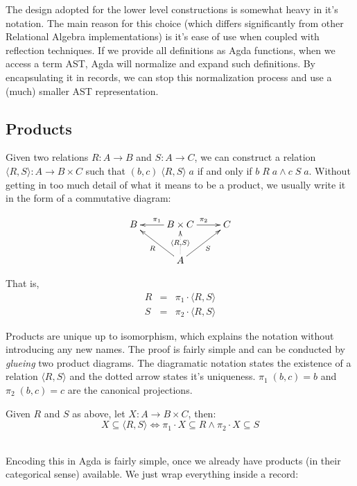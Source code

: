 The design adopted for the lower level constructions is somewhat heavy in it's notation. The
main reason for this choice (which differs significantly from other Relational Algebra implementations)
is it's ease of use when coupled with reflection techniques. If we provide all definitions
as Agda functions, when we access a term AST, Agda will normalize and expand such definitions.
By encapsulating it in records, we can stop this normalization process and use a (much) smaller
AST representation.

\subsection{Products}

Given two relations $R : A \rightarrow B$ and $S : A \rightarrow C$, we can construct a relation
$\langle R , S \rangle : A \rightarrow B \times C$ such that $(b,c)\;\langle R , S \rangle\;a$ if and only if $b\;R\;a \wedge c\;S\;a$.
Without getting in too much detail of what it means to be a product, we usually write
it in the form of a commutative diagram:

\begin{displaymath}
\xymatrix{%
B & B \times C \ar[l]_{\pi_1} \ar[r]^{\pi_2} & C \\
  &     A \ar@{..>}[u]|{\langle R , S \rangle} \ar[ul]^{R} \ar[ur]_{S}
  &
}
\end{displaymath} 

That is,
\begin{eqnarray*}
  R &=& \pi_1 \cdot \langle R , S \rangle \\
  S &=& \pi_2 \cdot \langle R , S \rangle
\end{eqnarray*}

Products are unique up to isomorphism, which explains the notation without introducing any new names.
The proof is fairly simple and can be conducted by \emph{glueing} two product diagrams.
The diagramatic notation states the existence of a relation $\langle R , S \rangle$ and the dotted arrow
states it's uniqueness. $\pi_1\;(b , c) = b$ and $\pi_2\;(b , c) = c$ are the canonical
projections.\\

\begin{mydef}
Given $R$ and $S$ as above, let $X : A \rightarrow B \times C$, then:
\[
  X \subseteq \langle R , S \rangle \Leftrightarrow \pi_1 \cdot X \subseteq R \wedge \pi_2 \cdot X \subseteq S
\]\\
\end{mydef}
Encoding this in Agda is fairly simple, once we already have products (in their categorical sense)
available. We just wrap everything inside a record:

